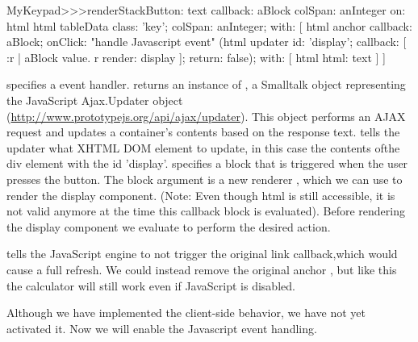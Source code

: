 \documentclass[a4paper,10pt,twoside]{book}
\begin{document}

\begin{code}{}
MyKeypad>>>renderStackButton: text callback: aBlock colSpan: anInteger on: html 
	html tableData
		class: 'key';
		colSpan: anInteger;
		with: [
			html anchor
				callback: aBlock;
				onClick:				"handle Javascript event"
					(html updater
						id: 'display';
						callback: [ :r |
							aBlock value.
							r render: display ];
						return: false);
				with: [ html html: text ] ]
\end{code}

 specifies a  event handler.
 returns an instance of , a Smalltalk object representing
the JavaScript Ajax.Updater object (\url{http://www.prototypejs.org/api/ajax/updater}).
This object performs an AJAX request and updates a container's contents based on the
response text.
 tells the updater what XHTML DOM element to update, in this case the contents ofthe div element with the id 'display'.
 specifies a block that is triggered when the user presses the button.
The block argument is a new renderer , which we can use to render the display
component.
(Note: Even though html is still accessible, it is not valid anymore at the time this
callback block is evaluated).
Before rendering the display component we evaluate  to perform the desired
action.

 tells the JavaScript engine to not trigger the original link callback,which would cause a full refresh.
We could instead remove the original anchor , but like this the calculator
will still work even if JavaScript is disabled.


Although we have implemented the client-side behavior, we have not yet activated it.
Now we will enable the Javascript event handling.
\end{document}
